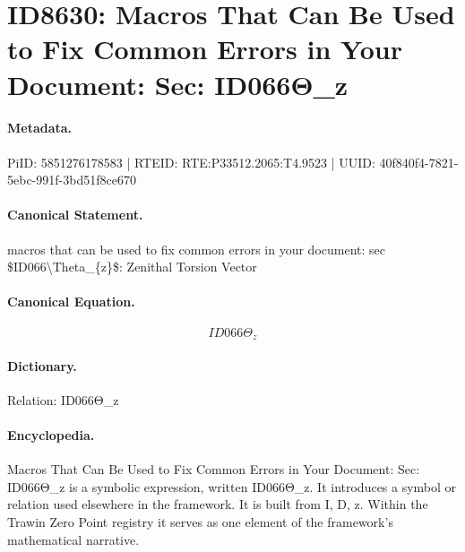 \section*{ID8630: Macros That Can Be Used to Fix Common Errors in Your Document: Sec: ID066Θ\_z}
\paragraph{Metadata.}
PiID: 5851276178583 | RTEID: RTE:P33512.2065:T4.9523 | UUID: 40f840f4-7821-5ebc-991f-3bd51f8ce670

\paragraph{Canonical Statement.}
macros that can be used to fix common errors in your document: sec \$ID066\textbackslash{}Theta\_\{z\}\$: Zenithal Torsion Vector

\paragraph{Canonical Equation.}
\[
ID066\Theta_{z}
\]

\paragraph{Dictionary.}
Relation: ID066Θ\_z

\paragraph{Encyclopedia.}
Macros That Can Be Used to Fix Common Errors in Your Document: Sec: ID066Θ\_z is a symbolic expression, written ID066Θ\_z. It introduces a symbol or relation used elsewhere in the framework. It is built from I, D, z. Within the Trawin Zero Point registry it serves as one element of the framework's mathematical narrative.
